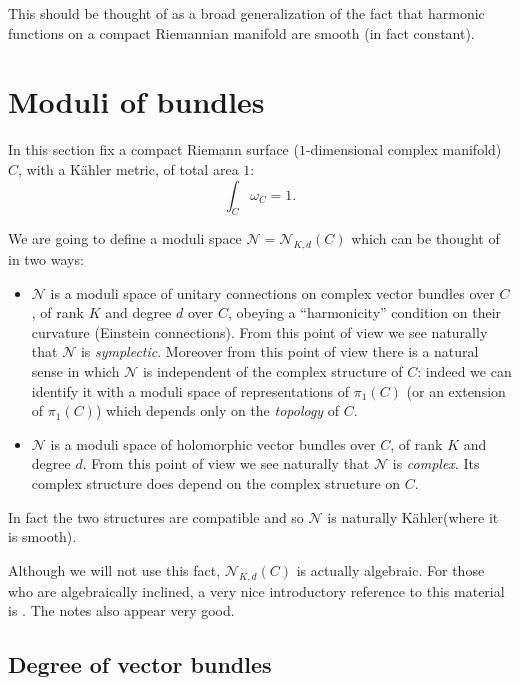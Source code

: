 \documentclass[12pt,letterpaper,reqno]{article}
\numberwithin{equation}{section}
\newcommand{\cN}{\ensuremath{\mathcal N}}
\newcommand{\R}{\ensuremath{\mathbb R}}
\newcommand{\kahler}{K\"ahler\xspace}
\newcommand{\ti}[1]{\textit{#1}}
\begin{document}
This should be thought of as a broad generalization of the
fact that harmonic functions on a compact Riemannian manifold
are smooth (in fact constant).



\section{Moduli of bundles}

In this section fix a compact Riemann surface ($1$-dimensional
complex manifold) $C$, with a \kahler metric, of total area $1$:
\begin{equation}
  \int_C \omega_C = 1.
\end{equation}

We are going to define a moduli space $\cN = \cN_{K,d}(C)$ which can be
thought of in two ways:
\begin{itemize}
\item $\cN$ is a moduli space of unitary connections on
complex vector bundles over $C$, of
rank $K$ and degree $d$ over $C$, obeying a ``harmonicity''
condition on their curvature (Einstein connections).
From this point of view we see naturally that $\cN$ is
\ti{symplectic}. Moreover from this point of view
there is a natural sense in which $\cN$ is independent
of the complex structure of $C$: indeed we can identify
it with a moduli space of representations of $\pi_1(C)$
(or an extension of $\pi_1(C)$) which depends only
on the \ti{topology} of $C$.
\item $\cN$ is a moduli space of holomorphic vector
bundles over $C$, of rank $K$ and degree $d$.
From this point of view we see naturally that $\cN$ is
\ti{complex}. Its complex structure does depend on
the complex structure on $C$.
\end{itemize}
In fact the two structures are compatible and so
$\cN$ is naturally \kahler (where it is smooth).

Although we will not use this fact, $\cN_{K,d}(C)$ is actually
algebraic. For those who are algebraically inclined, a
very nice introductory reference to this
material is \cite{MR98b:14010}. The notes
\cite{MR2408226} also appear very good.


\subsection{Degree of vector bundles}
\end{document}
